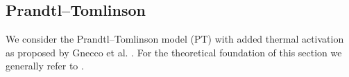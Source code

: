 \subsection{Prandtl–Tomlinson}
We consider the Prandtl–Tomlinson model (\acrshort{PT}) \cite[2,3]{Yalin_2011} with added thermal activation as proposed by Gnecco et al. \cite{PhysRevLett.84.1172}. For the theoretical foundation of this section  we generally refer to  \cite{Yalin_2011}.




